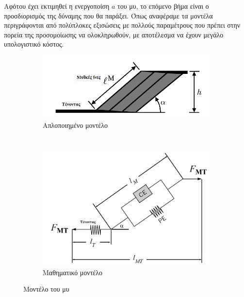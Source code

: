Αφότου έχει εκτιμηθεί η ενεργοποίση $a$ του μυ, το επόμενο βήμα είναι ο προσδιορισμός της δύναμης που θα παράξει. Όπως αναφέραμε τα μοντέλα  περιγράφονται από πολύπλοκες εξισώσεις με πολλούς παραμέτρους που πρέπει στην πορεία της προσομοίωσης να ολοκληρωθούν, με αποτέλεσμα να έχουν μεγάλο υπολογιστικό κόστος.

\begin{figure}[H]
    \centering
    \begin{subfigure}[Η]{.5\textwidth}
        \includegraphics[width=\textwidth, keepaspectratio]{fig/simple-muscle-model.png}
        \caption{Απλοποιημένο μοντέλο\cite{millard13}}
        \label{fig:simple-mascle-model}
    \end{subfigure} ~
    \begin{subfigure}[Η]{.4\textwidth}
        \includegraphics[width=\textwidth, keepaspectratio]{fig/muscle-model.png}
        \caption{Μαθηματικό μοντέλο\cite{erdemir07}}
        \label{fig:muscle-model}
    \end{subfigure}
    \caption{Μοντέλο του μυ}
\end{figure}

